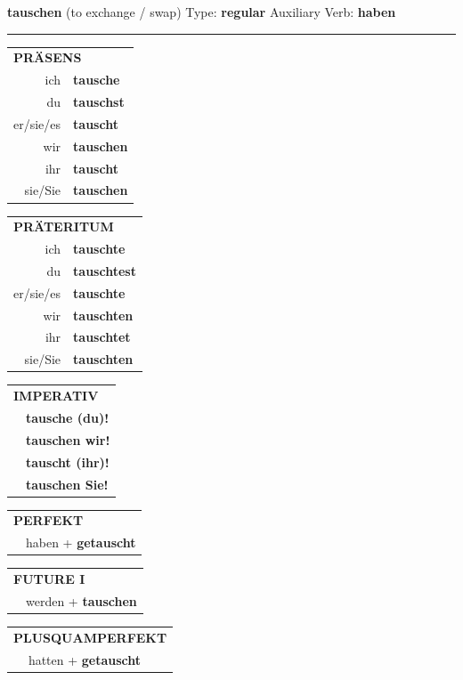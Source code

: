 \documentclass[10pt,a4paper]{revtex4-2}
\begin{document}
\begin{verbbox}
{\Large \bf tauschen} (to exchange / swap) \hfill Type: \textbf{regular} \hfill Auxiliary Verb: \textbf{haben}

\vspace{5pt}
\hrule
\vspace{5pt}

\begin{tabular}{rl}
\multicolumn{2}{l}{\textbf{PRÄSENS}}\\
ich & \textbf{tausche}\\
du & \textbf{tauschst}\\
er/sie/es & \textbf{tauscht}\\
wir & \textbf{tauschen}\\
ihr & \textbf{tauscht}\\
sie/Sie & \textbf{tauschen}\\
\end{tabular}
\hfill
\begin{tabular}{rl}
\multicolumn{2}{l}{\textbf{PRÄTERITUM}}\\
ich & \textbf{tauschte}\\
du & \textbf{tauschtest}\\
er/sie/es & \textbf{tauschte}\\
wir & \textbf{tauschten}\\
ihr & \textbf{tauschtet}\\
sie/Sie & \textbf{tauschten}\\
\end{tabular}
\hfill
\begin{tabular}{rl}
\multicolumn{2}{l}{\textbf{IMPERATIV}}\\
& \textbf{tausche (du)!}\\
& \textbf{tauschen wir!}\\
& \textbf{tauscht (ihr)!}\\
& \textbf{tauschen Sie!}\\
\end{tabular}

\vspace{10pt}

\begin{tabular}{rl}
\multicolumn{2}{l}{\textbf{PERFEKT}}\\
& haben + \textbf{getauscht}\\
\end{tabular}
\hfill
\begin{tabular}{rl}
\multicolumn{2}{l}{\textbf{FUTURE I}}\\
& werden + \textbf{tauschen}\\
\end{tabular}
\hfill
\begin{tabular}{rl}
\multicolumn{2}{l}{\textbf{PLUSQUAMPERFEKT}}\\
& hatten + \textbf{getauscht}\\
\end{tabular}


\end{verbbox}
\end{document}
